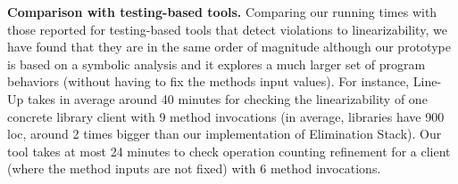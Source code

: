\vspace{1mm}
\noindent
{\bf Comparison with testing-based tools.} Comparing our running times with those reported for 
testing-based tools that detect violations to linearizability, we have found that they are in the same 
order of magnitude although our prototype is based on a symbolic analysis and it explores a much larger 
set of program behaviors (without having to fix the methods input values).
For instance, Line-Up takes in average around 40 minutes for checking the linearizability of one 
concrete library client with 9 method invocations (in average, libraries have 900 loc, around 2 times bigger 
than our implementation of Elimination Stack). Our tool takes at most 24 minutes to check 
operation counting refinement for a client (where the method inputs are not fixed) with 6 method invocations.


